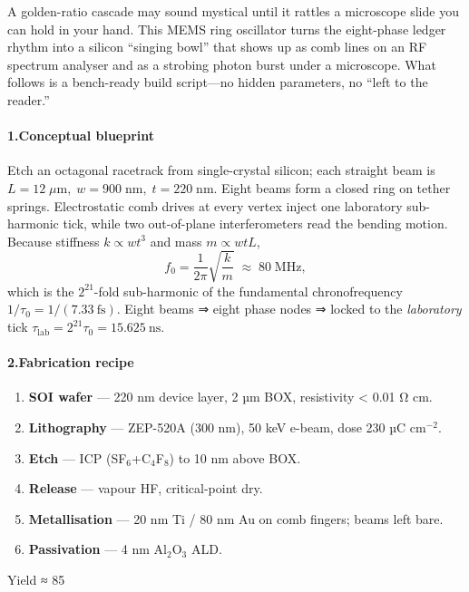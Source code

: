 \documentclass[11pt,oneside]{book}
\begin{document}
A golden-ratio cascade may sound mystical until it rattles a microscope
slide you can hold in your hand.  
This MEMS ring oscillator turns the eight-phase ledger rhythm into a
silicon “singing bowl” that shows up as comb lines on an RF spectrum
analyser and as a strobing photon burst under a microscope.  
What follows is a bench-ready build script—no hidden parameters, no
“left to the reader.”

\paragraph*{1.\;Conceptual blueprint}
Etch an octagonal racetrack from single-crystal silicon; each straight
beam is
\(L = 12\;\mu\text{m},\; w = 900\;\text{nm},\; t = 220\;\text{nm}\).
Eight beams form a closed ring on tether springs.  
Electrostatic comb drives at every vertex inject one laboratory
sub-harmonic tick, while two out-of-plane interferometers read the
bending motion.  
Because stiffness \(k\propto wt^{3}\) and mass \(m\propto wtL\),
\[
   f_{0}
   =\frac{1}{2\pi}\sqrt{\frac{k}{m}}
   \;\approx\; 80\;\text{MHz},
\]
which is the \(2^{21}\)-fold sub-harmonic of the fundamental
chrono­frequency
\(1/\tau_{0}=1/(7.33\ \text{fs})\).  
Eight beams ⇒ eight phase nodes ⇒ locked to the \emph{laboratory} tick  
\(\tau_{\text{lab}} = 2^{21}\tau_{0} = 15.625\ \text{ns}\).

\paragraph*{2.\;Fabrication recipe}
\begin{enumerate}
   \item \textbf{SOI wafer} — 220 nm device layer, 2 µm BOX,
         resistivity < 0.01 Ω cm.
   \item \textbf{Lithography} — ZEP-520A (300 nm), 50 keV e-beam,
         dose 230 µC cm\(^{-2}\).
   \item \textbf{Etch} — ICP (SF\(_6\)+C\(_4\)F\(_8\)) to 10 nm above BOX.
   \item \textbf{Release} — vapour HF, critical-point dry.
   \item \textbf{Metallisation} — 20 nm Ti / 80 nm Au on comb fingers; beams
         left bare.
   \item \textbf{Passivation} — 4 nm Al\(_2\)O\(_3\) ALD.
\end{enumerate}
Yield ≈ 85 %
\end{document}
